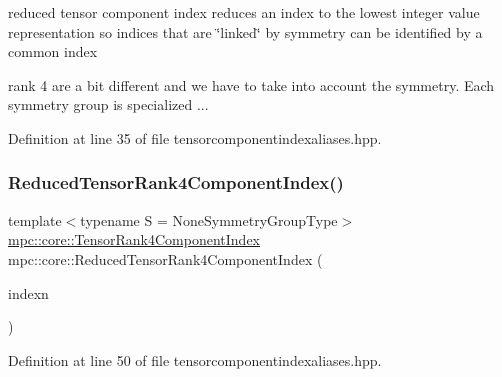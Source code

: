 reduced tensor component index reduces an index to the lowest integer value representation so indices that are \char`\"{}linked\char`\"{} by symmetry can be identified by a common index 

rank 4 are a bit different and we have to take into account the symmetry. Each symmetry group is specialized ... 

Definition at line 35 of file tensorcomponentindexaliases.\+hpp.

\mbox{\label{namespacempc_1_1core_ae67b259d682419c12fa2e072049d20ad}} 
\subsubsection{\texorpdfstring{Reduced\+Tensor\+Rank4\+Component\+Index()}{ReducedTensorRank4ComponentIndex()}\hspace{0.1cm}{\footnotesize\ttfamily [1/2]}}
{\footnotesize\ttfamily template$<$typename S  = None\+Symmetry\+Group\+Type$>$ \\
\mbox{\hyperlink{namespacempc_1_1core_a54c081f41b2475abd10182bf023805d2}{mpc\+::core\+::\+Tensor\+Rank4\+Component\+Index}} mpc\+::core\+::\+Reduced\+Tensor\+Rank4\+Component\+Index (\begin{DoxyParamCaption}\item[{const \mbox{\hyperlink{namespacempc_1_1core_a54c081f41b2475abd10182bf023805d2}{mpc\+::core\+::\+Tensor\+Rank4\+Component\+Index}} \&}]{indexn }\end{DoxyParamCaption})\hspace{0.3cm}{\ttfamily [inline]}}



Definition at line 50 of file tensorcomponentindexaliases.\+hpp.

\mbox{\label{namespacempc_1_1core_af5434f54bedc11f7a8ace3b9b11fb6ff}} 
